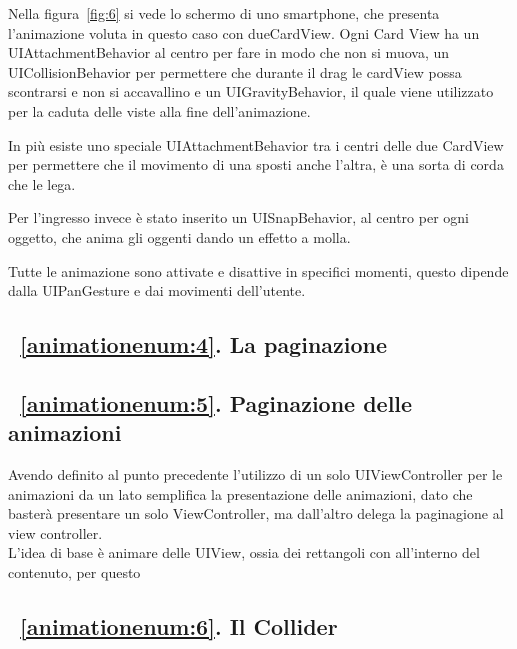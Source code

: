 Nella figura~\ref{fig:6} si vede lo schermo di uno smartphone, che presenta l'animazione
voluta in questo caso con dueCardView. Ogni Card View ha un UIAttachmentBehavior al centro per fare in modo che non
si muova, un UICollisionBehavior per permettere che durante il drag le cardView possa scontrarsi e non si accavallino e un UIGravityBehavior, il quale 
viene utilizzato per la caduta delle viste alla fine dell'animazione.

In più esiste uno speciale UIAttachmentBehavior tra i centri delle due CardView per permettere che il movimento di una
sposti anche l'altra, è una sorta di corda che le lega.

Per l'ingresso invece è stato inserito un UISnapBehavior, al centro per ogni oggetto, che anima 
gli oggenti dando un effetto a molla.

Tutte le animazione sono attivate e disattive in specifici momenti, questo dipende 
dalla UIPanGesture e dai movimenti dell'utente.

\subsection{~\ref{animationenum:4}. La paginazione}

\subsection{~\ref{animationenum:5}. Paginazione delle animazioni}

Avendo definito al punto precedente l'utilizzo di un solo UIViewController per le animazioni da un lato semplifica
la presentazione delle animazioni, dato che basterà presentare un solo ViewController, ma dall'altro delega
la paginagione al view controller. \\

L'idea di base è animare delle UIView, ossia dei rettangoli con all'interno del contenuto, per questo 

\subsection{~\ref{animationenum:6}. Il Collider}
